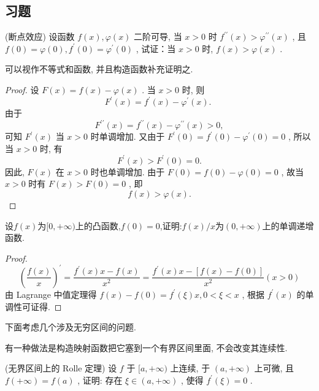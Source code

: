 \subsection{习题}



\begin{prob}

    (断点效应) 设函数  $f(x), \varphi(x)$  二阶可导, 当  $x>0$  时  $f^{\prime \prime}(x)>\varphi^{\prime \prime}(x)$ , 且  $f(0)=\varphi(0) ,  f^{\prime}(0)=\varphi^{\prime}(0)$ , 试证：当  $x>0$  时,  $f(x)>\varphi(x)$ .

\end{prob}
可以视作不等式和函数, 并且构造函数补充证明之. 
\begin{proof}
    设  $F(x)=f(x)-\varphi(x)$ . 当  $x>0$  时,
则
$$
F^{\prime}(x)=f^{\prime}(x)-\varphi^{\prime}(x) \text {. }
$$
由于
$$
F^{\prime \prime}(x)=f^{\prime \prime}(x)-\varphi^{\prime \prime}(x)>0,
$$
可知  $F^{\prime}(x)$  当  $x>0$  时单调增加.
又由于  $F^{\prime}(0)=f^{\prime}(0)-\varphi^{\prime}(0)=0$ ,
所以当  $x>0$  时, 有
$$
F^{\prime}(x)>F^{\prime}(0)=0 .
$$
因此,  $F(x)$  在  $x>0$  时也单调增加. 由于  $F(0)=f(0)-\varphi(0)=0$ , 故当  $x>0$  时有  $F(x)>F(0)=0$ , 即
$$
f(x)>\varphi(x) .
$$
\end{proof}



\begin{prob}%
    设$f(x)$为$[0,+ \infty)$上的凸函数,$f(0)=0$,证明:$f(x)/x$为$(0,+\infty)$上的单调递增函数.     
\end{prob} 

\begin{proof}
    $$\left(\frac{f(x)}{x}\right)^{\prime}=\frac{f^{\prime}(x) x-f(x)}{x^{2}}=\frac{f^{\prime}(x) x-[f(x)-f(0)]}{x^{2}}   (x>0)$$
      由 Lagrange 中值定理得  $f(x)-f(0)=f^{\prime}(\xi) x, 0<\xi<x$ , 根据  $f^{\prime}(x)$  的单调性可证得.
\end{proof}



下面考虑几个涉及无穷区间的问题. 

有一种做法是构造映射函数把它塞到一个有界区间里面, 不会改变其连续性. 

\begin{prob}
    (无界区间上的 Rolle 定理) 设  $f$  于  $[a,+\infty)$  上连续, 于  $(a,+\infty)$  上可微, 且  $f(+\infty)=   f(a)$ , 证明: 存在  $\xi \in(a,+\infty)$ , 使得  $f^{\prime}(\xi)=0$ .
\end{prob}

